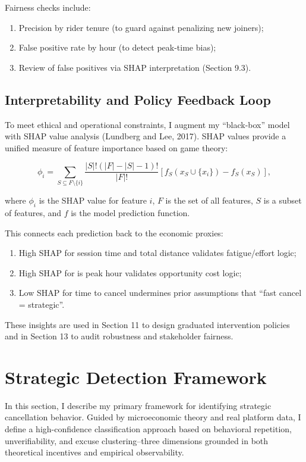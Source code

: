 Fairness checks include:
\begin{enumerate}
    \item Precision by rider tenure (to guard against penalizing new joiners);
    \item False positive rate by hour (to detect peak-time bias);
    \item Review of false positives via SHAP interpretation (Section 9.3).
\end{enumerate}

\subsection{Interpretability and Policy Feedback Loop}

To meet ethical and operational constraints, I augment my ``black-box'' model with SHAP value analysis (Lundberg and Lee, 2017). SHAP values provide a unified measure of feature importance based on game theory:

\begin{equation}
\phi_i = \sum_{S \subseteq F \setminus \{i\}} \frac{|S|!(|F| - |S| - 1)!}{|F|!} [f_S(x_S \cup \{x_i\}) - f_S(x_S)],
\end{equation}

where $\phi_i$ is the SHAP value for feature $i$, $F$ is the set of all features, $S$ is a subset of features, and $f$ is the model prediction function.

This connects each prediction back to the economic proxies:

\begin{enumerate}
    \item High SHAP for session time and total distance validates fatigue/effort logic;
    \item High SHAP for is peak hour validates opportunity cost logic;
    \item Low SHAP for time to cancel undermines prior assumptions that ``fast cancel = strategic''.
\end{enumerate}

These insights are used in Section 11 to design graduated intervention policies and in Section 13 to audit robustness and stakeholder fairness.

\section{Strategic Detection Framework}

In this section, I describe my primary framework for identifying strategic cancellation behavior. Guided by microeconomic theory and real platform data, I define a high-confidence classification approach based on behavioral repetition, unverifiability, and excuse clustering--three dimensions grounded in both theoretical incentives and empirical observability.

